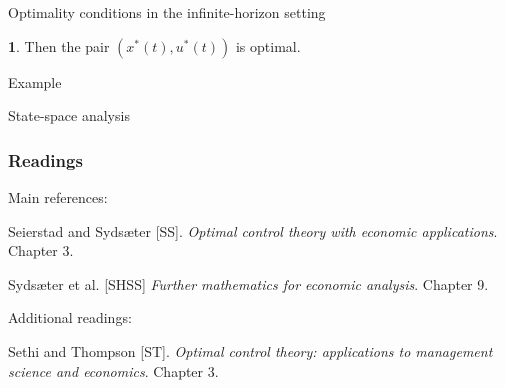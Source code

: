 \documentclass[10pt]{beamer}
\theoremstyle{definition}
\newtheorem{Fact}{\translate{Fact}}
\begin{document}
\begin{section}{Optimality conditions in the infinite-horizon setting}
\begin{frame}[fragile]
\begin{itemize}
\begin{Fact}
Then the pair $ (x^*(t),u^*(t)) $ is optimal.
\label{fc:simpleSC}
\end{Fact}
\end{itemize}
\end{frame}










Example

State-space analysis

\end{section}

\begin{frame}[fragile]
\frametitle{Readings}
Main references:\bigskip

Seierstad and Syds\ae{}ter [SS]. \emph{Optimal control theory with economic applications}. Chapter 3.

Syds\ae{}ter et al. [SHSS] \emph{Further mathematics for economic analysis}. Chapter 9.\bigskip

Additional readings:

Sethi and Thompson [ST]. \emph{Optimal control theory: applications to management science and economics}. Chapter 3.
\end{frame}
\end{document}
